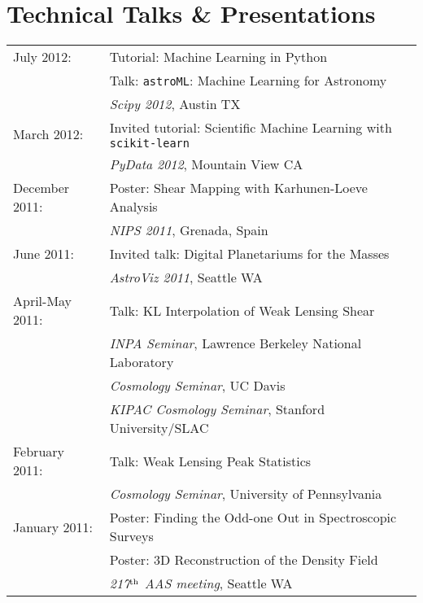 {\section*{Technical Talks \& Presentations}
\begin{tabular}{ll}
   July 2012:     & Tutorial: Machine Learning in Python\\
                  & Talk: {\tt astroML}: Machine Learning for Astronomy\\
                  & \hspace{1cm} {\it Scipy 2012}, Austin TX\\
   March 2012:    & Invited tutorial: Scientific Machine Learning with
                    {\tt scikit-learn}\\
                  & \hspace{1cm} {\it PyData 2012}, Mountain View CA\\
   December 2011: & Poster: Shear Mapping with Karhunen-Loeve Analysis\\
                  & \hspace{1cm} {\it NIPS 2011}, Grenada, Spain\\
   June 2011:     & Invited talk: Digital Planetariums for the  Masses\\
                  & \hspace{1cm} {\it AstroViz 2011}, Seattle WA\\
   April-May 2011:& Talk: KL Interpolation of Weak Lensing Shear\\
                  & \hspace{1cm} {\it INPA Seminar},
                    Lawrence Berkeley National Laboratory\\
                  & \hspace{1cm} {\it Cosmology Seminar}, UC Davis\\
                  & \hspace{1cm} {\it KIPAC Cosmology Seminar},
                    Stanford University/SLAC\\
   February 2011: & Talk: Weak Lensing Peak Statistics\\
                  & \hspace{1cm} {\it Cosmology Seminar},
                    University of Pennsylvania\\
   January 2011:  & Poster: Finding the Odd-one Out in Spectroscopic Surveys\\
                  & Poster: 3D Reconstruction of the Density Field\\
                  & \hspace{1cm} {\it 217$^{\rm th}$ AAS meeting}, Seattle WA\\

\end{tabular}}
